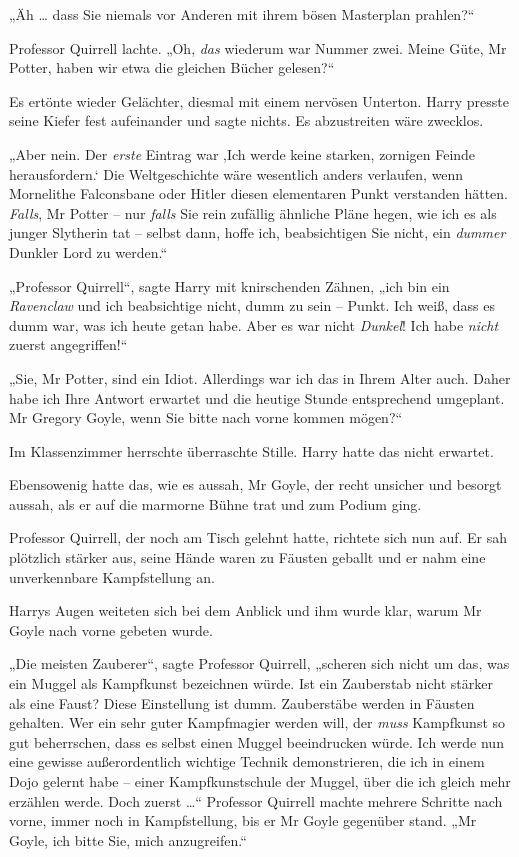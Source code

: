 {„Äh … dass Sie niemals vor Anderen mit ihrem bösen Masterplan prahlen?“

Professor Quirrell lachte. „Oh, \emph{das} wiederum war Nummer zwei. Meine Güte, Mr Potter, haben wir etwa die gleichen Bücher gelesen?“

Es ertönte wieder Gelächter, diesmal mit einem nervösen Unterton. Harry presste seine Kiefer fest aufeinander und sagte nichts. Es abzustreiten wäre zwecklos.

„Aber nein. Der \emph{erste} Eintrag war ‚Ich werde keine starken, zornigen Feinde herausfordern.` Die Weltgeschichte wäre wesentlich anders verlaufen, wenn Mornelithe Falconsbane oder Hitler diesen elementaren Punkt verstanden hätten. \emph{Falls}, Mr Potter -- nur \emph{falls} Sie rein zufällig ähnliche Pläne hegen, wie ich es als junger Slytherin tat -- selbst dann, hoffe ich, beabsichtigen Sie nicht, ein \emph{dummer} Dunkler Lord zu werden.“

„Professor Quirrell“, sagte Harry mit knirschenden Zähnen, „ich bin ein \emph{Ravenclaw} und ich beabsichtige nicht, dumm zu sein -- Punkt. Ich weiß, dass es dumm war, was ich heute getan habe. Aber es war nicht \emph{Dunkel}! Ich habe \emph{nicht} zuerst angegriffen!“

„Sie, Mr Potter, sind ein Idiot. Allerdings war ich das in Ihrem Alter auch. Daher habe ich Ihre Antwort erwartet und die heutige Stunde entsprechend umgeplant. Mr Gregory Goyle, wenn Sie bitte nach vorne kommen mögen?“

Im Klassenzimmer herrschte überraschte Stille. Harry hatte das nicht erwartet.

Ebensowenig hatte das, wie es aussah, Mr Goyle, der recht unsicher und besorgt aussah, als er auf die marmorne Bühne trat und zum Podium ging.

Professor Quirrell, der noch am Tisch gelehnt hatte, richtete sich nun auf. Er sah plötzlich stärker aus, seine Hände waren zu Fäusten geballt und er nahm eine unverkennbare Kampfstellung an.

Harrys Augen weiteten sich bei dem Anblick und ihm wurde klar, warum Mr Goyle nach vorne gebeten wurde.

„Die meisten Zauberer“, sagte Professor Quirrell, „scheren sich nicht um das, was ein Muggel als Kampfkunst bezeichnen würde. Ist ein Zauberstab nicht stärker als eine Faust? Diese Einstellung ist dumm. Zauberstäbe werden in Fäusten gehalten. Wer ein sehr guter Kampfmagier werden will, der \emph{muss} Kampfkunst so gut beherrschen, dass es selbst einen Muggel beeindrucken würde. Ich werde nun eine gewisse außerordentlich wichtige Technik demonstrieren, die ich in einem Dojo gelernt habe -- einer Kampfkunstschule der Muggel, über die ich gleich mehr erzählen werde. Doch zuerst …“ Professor Quirrell machte mehrere Schritte nach vorne, immer noch in Kampfstellung, bis er Mr Goyle gegenüber stand. „Mr Goyle, ich bitte Sie, mich anzugreifen.“

}
